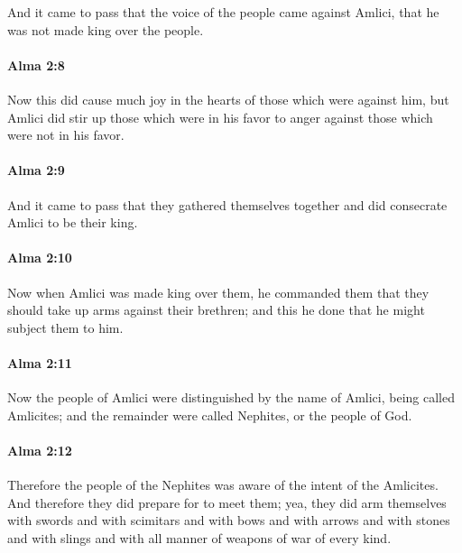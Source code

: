 			And it came to pass that the voice of the people came against Amlici,
			that he was not made king over the people.

		\paragraph{Alma 2:8} %
			\label{ALMA-2-8}

			Now this did cause much joy in the hearts of those which were against him,
			but Amlici did stir up those which were in his favor
			to anger against those which were not in his favor.

		\paragraph{Alma 2:9} %
			\label{ALMA-2-9}

			And it came to pass that they gathered themselves together
			and did consecrate Amlici to be their king.

		\paragraph{Alma 2:10} %
			\label{ALMA-2-10}

			Now when Amlici was made king over them,
			he commanded them that they should take up arms against their brethren;
			and this he done that he might subject them to him.

		\paragraph{Alma 2:11} %
			\label{ALMA-2-11}

			Now the people of Amlici were distinguished by the name of Amlici,
			being called Amlicites;
			and the remainder were called Nephites, or the people of God.

		\paragraph{Alma 2:12} %
			\label{ALMA-2-12}

			Therefore the people of the Nephites was aware of the intent of the Amlicites.
			And therefore they did prepare for to meet them;
			yea, they did arm themselves with swords and with scimitars
			and with bows and with arrows
			and with stones and with slings
			and with all manner of weapons of war of every kind.

